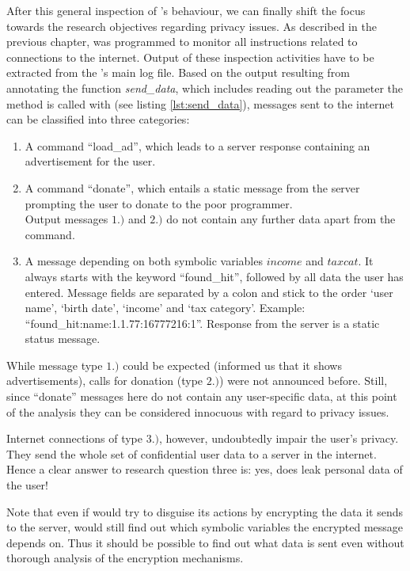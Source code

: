 \medskip

After this general inspection of \app's behaviour, we can finally shift the focus towards the research objectives regarding privacy issues.
As described in the previous chapter, \sse was programmed to monitor all instructions related to connections to the internet.
Output of these inspection activities have to be extracted from the \sse's main log file.
Based on the output resulting from annotating the function \textit{send\_data}, which includes reading out the parameter the method is called with (see listing \ref{lst:send_data}), messages sent to the internet can be classified into three categories:
\begin{enumerate}
\item A command ``load\_ad'', which leads to a server response containing an advertisement for the user.
\item A command ``donate'', which entails a static message from the server prompting the user to donate to the poor programmer. \medskip \\
Output messages $1.)$ and $2.)$ do not contain any further data apart from the command.
\item A message depending on both symbolic variables $income$ and $taxcat$.
It always starts with the keyword ``found\_hit'', followed by all data the user has entered.
Message fields are separated by a colon and stick to the order `user name', `birth date', `income' and `tax category'. Example: ``found\_hit:name:1.1.77:16777216:1''.
Response from the server is a static status message.
\end{enumerate}

While message type $1.)$ could be expected (\app informed us that it shows advertisements), calls for donation (type $2.)$) were not announced before.
Still, since ``donate'' messages here do not contain any user-specific data, at this point of the analysis they can be considered innocuous with regard to privacy issues.

Internet connections of type $3.)$, however, undoubtedly impair the user's privacy.
They send the whole set of confidential user data to a server in the internet.
Hence a clear answer to research question three is: yes, \app does leak personal data of the user!

Note that even if \app would try to disguise its actions by encrypting the data it sends to the server, \sse would still find out which symbolic variables the encrypted message depends on.
Thus it should be possible to find out what data is sent even without thorough analysis of the encryption mechanisms.

